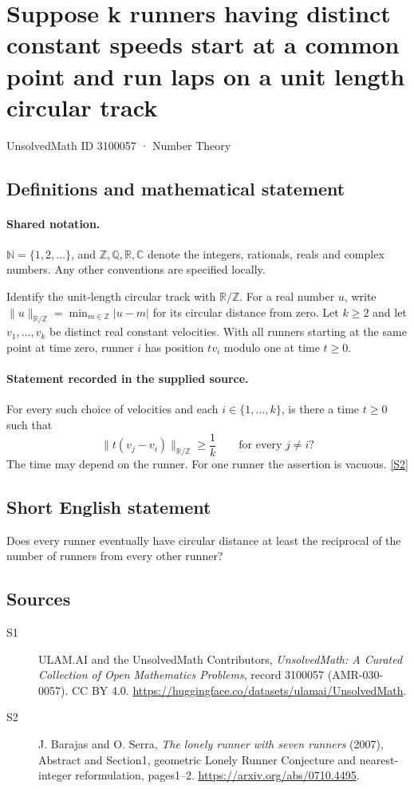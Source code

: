 \documentclass[11pt]{article}
\newcommand{\sref}[2]{\hyperlink{source:#1:#2}{[S#2]}}
\begin{document}
\setcounter{section}{3100056}
\section{Suppose k runners having distinct constant speeds start at a common point and run laps on a unit length circular track}\label{3100057}
{\small\sffamily UnsolvedMath ID 3100057 · Number Theory}
\subsection{Definitions and mathematical statement}

\paragraph{Shared notation.}$\mathbb N=\{1,2,\ldots\}$, and $\mathbb Z,\mathbb Q,\mathbb R,\mathbb C$ denote the integers, rationals, reals and complex numbers. Any other conventions are specified locally.


Identify the unit-length circular track with $\mathbb R/\mathbb Z$. For a real number $u$, write $\|u\|_{\mathbb R/\mathbb Z}=\min_{m\in\mathbb Z}|u-m|$ for its circular distance from zero. Let $k\ge2$ and let $v_1,\ldots,v_k$ be distinct real constant velocities. With all runners starting at the same point at time zero, runner $i$ has position $tv_i$ modulo one at time $t\ge0$.

\paragraph{Statement recorded in the supplied source.}
For every such choice of velocities and each $i\in\{1,\ldots,k\}$, is there a time $t\ge0$ such that
\[\|t(v_j-v_i)\|_{\mathbb R/\mathbb Z}\ge\frac1k\qquad\text{for every }j\ne i?\]
The time may depend on the runner. For one runner the assertion is vacuous. \sref{3100057}{2}

\subsection{Short English statement}
Does every runner eventually have circular distance at least the reciprocal of the number of runners from every other runner?
\subsection{Sources}
\begin{description}
\item[\hypertarget{source:3100057:1}{S1}] ULAM.AI and the UnsolvedMath Contributors, \emph{UnsolvedMath: A Curated Collection of Open Mathematics Problems}, record 3100057 (AMR-030-0057). CC BY 4.0. \url{https://huggingface.co/datasets/ulamai/UnsolvedMath}.
\item[\hypertarget{source:3100057:2}{S2}] J. Barajas and O. Serra, \emph{The lonely runner with seven runners} (2007), Abstract and Section1, geometric Lonely Runner Conjecture and nearest-integer reformulation, pages1--2. \url{https://arxiv.org/abs/0710.4495}.
\end{description}
\label{end:3100057}
\end{document}
